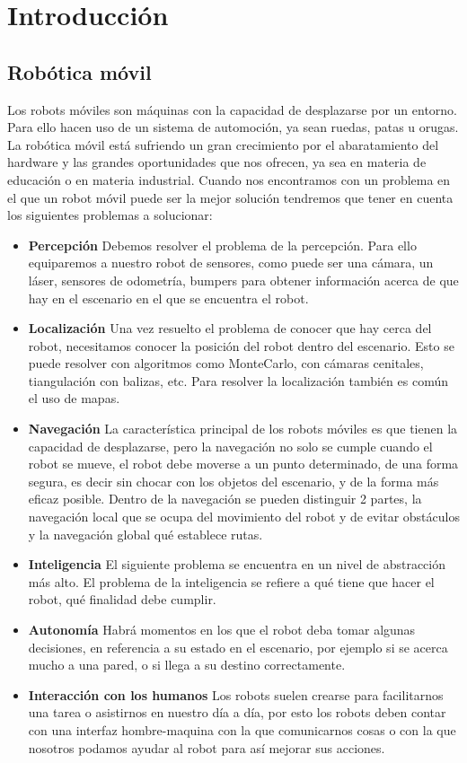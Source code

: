 \chapter{Introducción}
\label{cap:introduccion}

\section{Robótica móvil}
\label{cap:roboticamovil}
Los robots móviles son máquinas con la capacidad de desplazarse por un entorno. Para ello hacen uso de un sistema de automoción, ya sean ruedas, patas u orugas. 
La robótica móvil está sufriendo un gran crecimiento por el abaratamiento del hardware y las grandes oportunidades que nos ofrecen, ya sea en materia de educación o en materia industrial. 
Cuando nos encontramos con un problema en el que un robot móvil puede ser la mejor solución tendremos que tener en cuenta los siguientes problemas a solucionar:
\begin{itemize}
\item \textbf{Percepción} Debemos resolver el problema de la percepción. Para ello equiparemos a nuestro robot de sensores, como puede ser una cámara, un láser, sensores de odometría, bumpers para obtener información acerca de que hay en el escenario en el que se encuentra el robot.
\item \textbf{Localización} Una vez resuelto el problema de conocer que hay cerca del robot, necesitamos conocer la posición del robot dentro del escenario. Esto se puede resolver con algoritmos como MonteCarlo, con cámaras cenitales, tiangulación con balizas, etc. Para resolver la localización también es común el uso de mapas. 
\item \textbf{Navegación} La característica principal de los robots móviles es que tienen la capacidad de desplazarse, pero la navegación no solo se cumple cuando el robot se mueve, el robot debe moverse a un punto determinado, de una forma segura, es decir sin chocar con los objetos del escenario, y de la forma más eficaz posible. Dentro de la navegación se pueden distinguir 2 partes, la navegación local que se ocupa del movimiento del robot y de evitar obstáculos y la navegación global qué establece rutas.
\item \textbf{Inteligencia} El siguiente problema se encuentra en un nivel de abstracción más alto. El problema de la inteligencia se refiere a qué tiene que hacer el robot, qué finalidad debe cumplir.
\item \textbf{Autonomía} Habrá momentos en los que el robot deba tomar algunas decisiones, en referencia a su estado en el escenario, por ejemplo si se acerca mucho a una pared, o si llega a su destino correctamente.
\item \textbf{Interacción con los humanos} Los robots suelen crearse para facilitarnos una tarea o asistirnos en nuestro día a día, por esto los robots deben contar con una interfaz hombre-maquina con la que comunicarnos cosas o con la que nosotros podamos ayudar al robot para así mejorar sus acciones.
\end{itemize}

